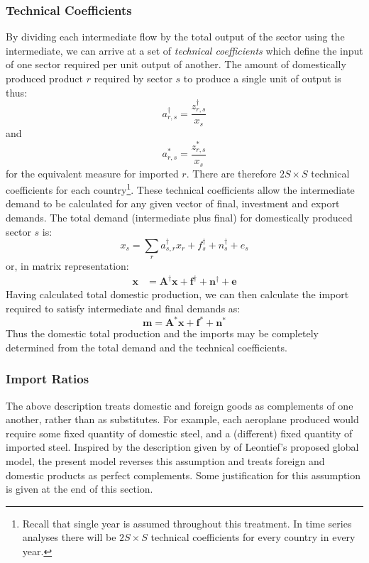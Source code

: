 \documentclass[a4paper]{article}
\begin{document}
\subsubsection*{Technical Coefficients}\label{sec:techcoeffs}
By dividing each intermediate flow by the total output of the sector using the intermediate, we can arrive at a set of \textit{technical coefficients} which define the input of one sector required per unit output of another.
The amount of domestically produced product $r$ required by sector $s$ to produce a single unit of output is thus:
\begin{equation}\label{eq:adagger}
a_{r,s}^\dagger = \frac{z^\dagger_{r,s}}{x_s}
\end{equation}
and
\begin{equation}\label{eq:astar}
a_{r,s}^* = \frac{z^*_{r,s}}{x_s}
\end{equation}
for the equivalent measure for imported $r$. There are therefore $2S \times S$ technical coefficients for each country\footnote{Recall that single year is assumed throughout this treatment.
In time series analyses there will be $2S \times S$ technical coefficients for every country in every year.}.
These technical coefficients allow the intermediate demand to be calculated for any given vector of final, investment and export demands. The total demand (intermediate plus final) for domestically produced sector $s$ is:
$$
x_s = \sum_r{a^\dagger_{s,r}x_r} + f^\dagger_s + n^\dagger_s + e_s 
$$
or, in matrix representation:
\begin{align}
\boldsymbol{x}& = 
\boldsymbol{A^\dagger}\boldsymbol{x}
+ 
\boldsymbol{f^\dagger} + \boldsymbol{n^\dagger} + \boldsymbol{e} 
\label{eqn:xIRIO}
\end{align}
Having calculated total domestic production, we can then calculate the import required to satisfy intermediate and final demands as:
\begin{equation}\label{eqn:mIRIO}
\boldsymbol{m}
=
\boldsymbol{A^*}\boldsymbol{x}
+
\boldsymbol{f^*} + \boldsymbol{n^*} 
\end{equation}
Thus the domestic total production and the imports may be completely determined from the total demand and the technical coefficients.

\subsubsection*{Import Ratios}\label{sec:importratios}

The above description treats domestic and foreign goods as complements of one another, rather than as substitutes.
For example, each aeroplane produced would require some fixed quantity of domestic steel, and a (different) fixed quantity of imported steel.
Inspired by the description given by \textcite{duchin_international_2004} of Leontief's proposed global model, the present model reverses this assumption and treats foreign and domestic products as perfect complements.
Some justification for this assumption is given at the end of this section.
\end{document}
